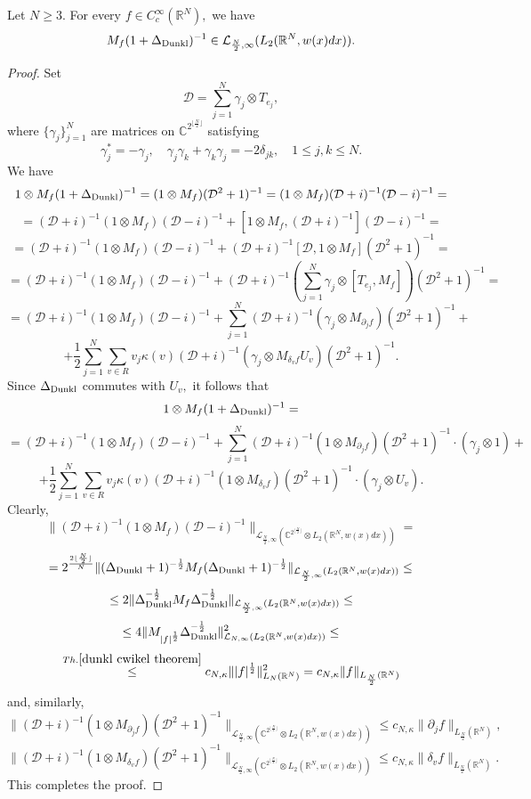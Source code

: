 \documentclass{amsart}
\begin{document}
\begin{lemma}\label{second power lemma} Let $N\geq3.$ For every $f\in C^{\infty}_c(\mathbb{R}^N),$ we have
$$M_f(1+\Delta_{{\rm Dunkl}})^{-1}\in \mathcal{L}_{\frac{N}{2},\infty}(L_2(\mathbb{R}^N,w(x)dx)).$$
\end{lemma}
\begin{proof} Set
$$\mathcal{D}=\sum_{j=1}^N\gamma_j\otimes T_{e_j},$$
where $\{\gamma_j\}_{j=1}^N$ are matrices on $\mathbb{C}^{2^{\lfloor \frac{N}{2}\rfloor}}$ satisfying
$$\gamma_j^{\ast}=-\gamma_j,\quad \gamma_j\gamma_k+\gamma_k\gamma_j=-2\delta_{jk},\quad 1\leq j,k\leq N.$$
We have
$$1\otimes M_f(1+\Delta_{{\rm Dunkl}})^{-1}=(1\otimes M_f)(\mathcal{D}^2+1)^{-1}=(1\otimes M_f)(\mathcal{D}+i)^{-1}(\mathcal{D}-i)^{-1}=$$
$$=(\mathcal{D}+i)^{-1}(1\otimes M_f)(\mathcal{D}-i)^{-1}+[1\otimes M_f,(\mathcal{D}+i)^{-1}](\mathcal{D}-i)^{-1}=$$
$$=(\mathcal{D}+i)^{-1}(1\otimes M_f)(\mathcal{D}-i)^{-1}+(\mathcal{D}+i)^{-1}[\mathcal{D},1\otimes M_f](\mathcal{D}^2+1)^{-1}=$$
$$=(\mathcal{D}+i)^{-1}(1\otimes M_f)(\mathcal{D}-i)^{-1}+(\mathcal{D}+i)^{-1}(\sum_{j=1}^N\gamma_j\otimes [T_{e_j},M_f])(\mathcal{D}^2+1)^{-1}=$$
$$=(\mathcal{D}+i)^{-1}(1\otimes M_f)(\mathcal{D}-i)^{-1}+\sum_{j=1}^N(\mathcal{D}+i)^{-1}(\gamma_j\otimes M_{\partial_jf})(\mathcal{D}^2+1)^{-1}+$$
$$+\frac12\sum_{j=1}^N\sum_{v\in R}v_j\kappa(v)(\mathcal{D}+i)^{-1}(\gamma_j\otimes M_{\delta_vf}U_v)(\mathcal{D}^2+1)^{-1}.$$
Since $\Delta_{{\rm Dunkl}}$ commutes with $U_v,$ it follows that
$$1\otimes M_f(1+\Delta_{{\rm Dunkl}})^{-1}=$$
$$=(\mathcal{D}+i)^{-1}(1\otimes M_f)(\mathcal{D}-i)^{-1}+\sum_{j=1}^N(\mathcal{D}+i)^{-1}(1\otimes M_{\partial_jf})(\mathcal{D}^2+1)^{-1}\cdot(\gamma_j\otimes 1)+$$
$$+\frac12\sum_{j=1}^N\sum_{v\in R}v_j\kappa(v)(\mathcal{D}+i)^{-1}(1\otimes M_{\delta_vf})(\mathcal{D}^2+1)^{-1}\cdot (\gamma_j\otimes U_v).$$
Clearly,
$$\|(\mathcal{D}+i)^{-1}(1\otimes M_f)(\mathcal{D}-i)^{-1}\|_{\mathcal{L}_{\frac{N}{2},\infty}(\mathbb{C}^{2^{\lfloor\frac{N}{2}\rfloor}}\otimes L_2(\mathbb{R}^N,w(x)dx))}=$$
$$=2^{\frac{2\lfloor\frac{N}{2}\rfloor}{N}}\|(\Delta_{{\rm Dunkl}}+1)^{-\frac12}M_f(\Delta_{{\rm Dunkl}}+1)^{-\frac12}\|_{\mathcal{L}_{\frac{N}{2},\infty}(L_2(\mathbb{R}^N,w(x)dx))}\leq$$
$$\leq 2\|\Delta_{{\rm Dunkl}}^{-\frac12}M_f\Delta_{{\rm Dunkl}}^{-\frac12}\|_{\mathcal{L}_{\frac{N}{2},\infty}(L_2(\mathbb{R}^N,w(x)dx))}\leq$$
$$\leq 4\|M_{|f|^{\frac12}}\Delta_{{\rm Dunkl}}^{-\frac12}\|_{\mathcal{L}_{N,\infty}(L_2(\mathbb{R}^N,w(x)dx))}^2\leq$$
$$\stackrel{Th.\ref{dunkl cwikel theorem}}{\leq}c_{N,\kappa}\||f|^{\frac12}\|_{L_N(\mathbb{R}^N)}^2=c_{N,\kappa}\|f\|_{L_{\frac{N}{2}}(\mathbb{R}^N)}$$
and, similarly,
$$\|(\mathcal{D}+i)^{-1}(1\otimes M_{\partial_jf})(\mathcal{D}^2+1)^{-1}\|_{\mathcal{L}_{\frac{N}{2},\infty}(\mathbb{C}^{2^{\lfloor\frac{N}{2}\rfloor}}\otimes L_2(\mathbb{R}^N,w(x)dx))}\leq c_{N,\kappa}\|\partial_jf\|_{L_{\frac{N}{2}}(\mathbb{R}^N)},$$
$$\|(\mathcal{D}+i)^{-1}(1\otimes M_{\delta_vf})(\mathcal{D}^2+1)^{-1}\|_{\mathcal{L}_{\frac{N}{2},\infty}(\mathbb{C}^{2^{\lfloor\frac{N}{2}\rfloor}}\otimes L_2(\mathbb{R}^N,w(x)dx))}\leq c_{N,\kappa}\|\delta_vf\|_{L_{\frac{N}{2}}(\mathbb{R}^N)}.$$
This completes the proof.
\end{proof}
\end{document}
